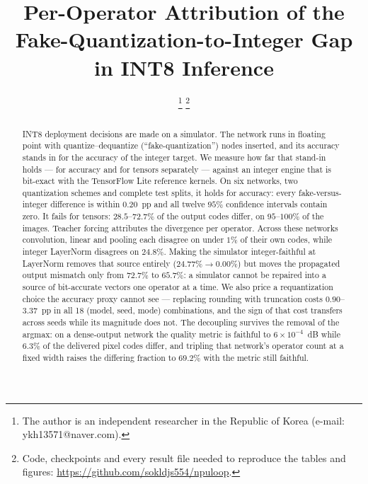 \documentclass[journal]{IEEEtran}
\begin{document}
\title{Per-Operator Attribution of the Fake-Quantization-to-Integer Gap in INT8 Inference}

\author{%
\thanks{The author is an independent researcher in the Republic of Korea
(e-mail: ykh13571@naver.com).}%
\thanks{Code, checkpoints and every result file needed to reproduce the tables and figures:
\url{https://github.com/sokldjs554/npuloop}.}}

\maketitle

\begin{abstract}
INT8 deployment decisions are made on a simulator. The network runs in floating point with
quantize--dequantize (``fake-quantization'') nodes inserted, and its accuracy stands in for the accuracy
of the integer target. We measure how far that stand-in holds --- for accuracy and for tensors separately
--- against an integer engine that is bit-exact with the TensorFlow Lite reference kernels. On six
networks, two quantization schemes and complete test splits, it holds for accuracy: every
fake-versus-integer difference is within $0.20$~pp and all twelve $95\%$ confidence intervals contain
zero. It fails for tensors: $28.5$--$72.7\%$ of the output codes differ, on $95$--$100\%$ of the images.
Teacher forcing attributes the divergence per operator. Across these networks convolution, linear and pooling
each disagree on under $1\%$ of their own codes, while integer LayerNorm disagrees on $24.8\%$. Making the simulator
integer-faithful at LayerNorm removes that source entirely ($24.77\% \rightarrow 0.00\%$) but moves the
propagated output mismatch only from $72.7\%$ to $65.7\%$: a simulator cannot be repaired into a source of
bit-accurate vectors one operator at a time. We also price a requantization choice the accuracy proxy
cannot see --- replacing rounding with truncation costs $0.90$--$3.37$~pp in all 18 (model, seed, mode)
combinations, and the sign of that cost transfers across seeds while its magnitude does not. The decoupling
survives the removal of the argmax: on a dense-output network the quality metric is faithful to
$6\times10^{-4}$~dB while $6.3\%$ of the delivered pixel codes differ, and tripling that network's operator
count at a fixed width raises the differing fraction to $69.2\%$ with the metric still faithful.
\end{abstract}
\end{document}
